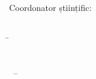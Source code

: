 %

\begin{center}
	\begin{vminipage}{\textwidth}
    	\centering
		{\Large \xthesisuniversity}
    	{\Large \xthesisfaculty}
	\end{vminipage}
  	{\ \vspace{4.1cm}}
	\begin{vminipage}[t][3.1cm][s]{\textwidth}%
		\centering
		\vfill
		{\HUGE\bfseries\xthesistitle}\\
		\bigskip
		{\huge\bfseries\xthesissubtitle}
		\vfill
	\end{vminipage}
	\vspace{1.7cm}

	{\LARGE \xthesistype}
	\vfill

	\begin{minipage}[t][1.6cm][t]{.95\textwidth}%
		\begin{flushleft}
	 	 	\Large
	  		Coordonator științific: \\
	  		\xthesisadvisor \\
  		\end{flushleft}
	\end{minipage}

	\vspace{0.5cm}

	\begin{minipage}[t][1.6cm][t]{.95\textwidth}%
		\Large
		\begin{tabbing}%
			\hspace{16cm} \= \hspace{2cm} \kill	
			\>  \\
			\> \textalign[r]{\xthesisauthor} \\   
		\end{tabbing}
	\end{minipage}

	\vspace{2.5cm}

	\begin{minipage}[b]{\textwidth}%
		\centering
		  \large
		\xthesiscity \, \--- \xthesisyear %
	\end{minipage}

\end{center}

\cleardoublepage
